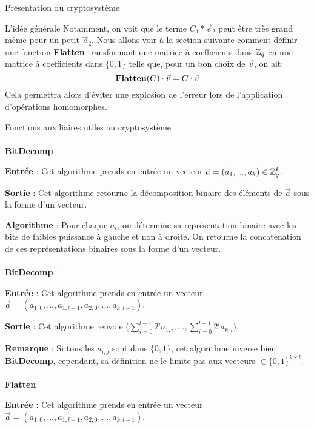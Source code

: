 \begin{section}{Présentation du cryptosystème}
\begin{subsection}{L'idée générale}
	Notamment, on voit que le terme $C_1 * \vec{e}_2$ peut être très grand
	même pour un petit $\vec{e}_2$. Nous allons voir à la section suivante
	comment définir une fonction \textbf{Flatten} transformant une matrice
	à coefficients dans $\mathbb{Z}_q$ en une matrice à coefficients dans $\{0, 1\}$
	telle que, pour un bon choix de $\vec{v}$, on ait:
	\[ \text{\textbf{Flatten}}(C)\cdot\vec{v} = C\cdot\vec{v}\] 
	Cela permettra alors d'éviter une explosion de l'erreur lors de
	l'application d'opérations homomorphes. 
	\end{subsection}
	\begin{subsection}{Fonctions auxiliaires utiles au cryptosystème}
	\paragraph{}
	\textbf{BitDecomp}
	\flushleft

	\textbf{Entrée} : Cet algorithme prends en entrée un vecteur $\vec{a} = (a_1, ..., a_k) \in \mathbb{Z}_q^{k}$.

	\textbf{Sortie} : Cet algorithme retourne la décomposition binaire des éléments de $\vec{a}$ sous la forme d'un vecteur.

	\textbf{Algorithme} : Pour chaque $a_i$, on détermine sa représentation binaire avec les bits de faibles puissance à gauche et non à droite. On retourne la concaténation de ces représentations binaires sous la forme d'un vecteur.
	
	\paragraph{}
	\textbf{BitDecomp}$^{-1}$
	\flushleft

	\textbf{Entrée} : Cet algorithme prends en entrée un vecteur $\vec{a} = (a_{1,0}, ..., a_{1,l-1}, a_{2,0}, ..., a_{k,l-1})$.

	\textbf{Sortie} : Cet algorithme renvoie ($\sum\limits_{i=0}^{l-1} 2^{i} a_{1,i}, ..., \sum\limits_{i=0}^{l-1} 2^{i} a_{k,i})$.

	\textbf{Remarque} : Si tous les $a_{i,j}$ sont dans $\{ 0,1 \} $, cet algorithme inverse bien \textbf{BitDecomp}, cependant, sa définition ne le limite pas aux vecteurs $\in \{ 0,1\} ^{k\times l}$.

	\paragraph{}
	\textbf{Flatten}
	\flushleft

	\textbf{Entrée} : Cet algorithme prends en entrée un vecteur $\vec{a} = (a_{1,0}, ..., a_{1,l-1}, a_{2,0}, ..., a_{k,l-1})$.


\end{subsection}
\end{section}

